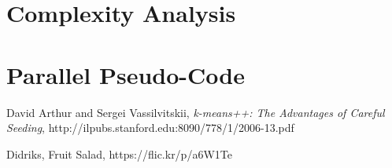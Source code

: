 \documentclass[11pt]{article}
\begin{document}
\section{Complexity Analysis}

\section{Parallel Pseudo-Code}

\begin{thebibliography}{9}

  David Arthur and Sergei Vassilvitskii,
  \emph{k-means++: The Advantages of Careful Seeding},
  http://ilpubs.stanford.edu:8090/778/1/2006-13.pdf

  Didriks,
  Fruit Salad,
  https://flic.kr/p/a6W1Te

\end{thebibliography}
\end{document}
